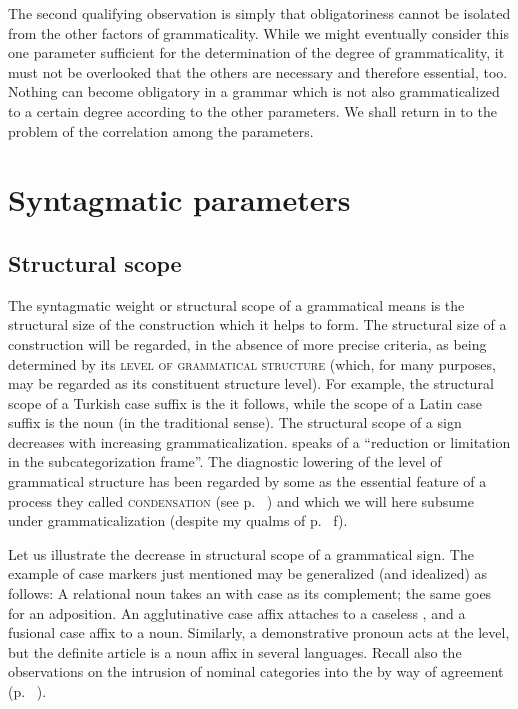 The second qualifying observation is simply that obligatoriness cannot be isolated from the other factors of grammaticality. While we might eventually consider this one parameter sufficient for the determination of the degree of grammaticality, it must not be overlooked that the others are necessary and therefore essential, too. Nothing can become obligatory in a grammar which is not also grammaticalized to a certain degree according to the other parameters. We shall return in  to the problem of the correlation among the parameters.

\section{Syntagmatic parameters} \label{sec:4.3}
\subsection{Structural scope} \label{sec:4.3.1}

The syntagmatic weight or structural scope of a grammatical means is the structural size of the construction which it helps to form. The structural size of a construction will be regarded, in the absence of more precise criteria, as being determined by its \textsc{level of grammatical structure} (which, for many purposes, may be regarded as its constituent structure level). For example, the structural scope of a Turkish case suffix is the \np it follows, while the scope of a Latin case suffix is the noun (in the traditional sense). The structural scope of a sign decreases with increasing grammaticalization. \citet[56f]{Vincent1980b} speaks of a “reduction or limitation in the subcategorization frame”. The diagnostic lowering of the level of grammatical structure has been regarded by some as the essential feature of a process they called \textsc{condensation} (see p.~\pageref{page12}\chk%
) and which we will here subsume under grammaticalization (despite my qualms of p.~\pageref{page12b}\chk%
f).

Let us illustrate the decrease in structural scope of a grammatical sign. The example of case markers just mentioned may be generalized (and idealized) as follows: A relational noun takes an \np with case as its complement; the same goes for an adposition. An agglutinative case affix attaches to a caseless \np, and a fusional case affix to a noun. Similarly, a demonstrative pronoun acts at the \np level, but the definite article is a noun affix in several languages. Recall also the observations on the intrusion of nominal categories into the \np by way of agreement (p.~\pageref{page63}\chk%
).

